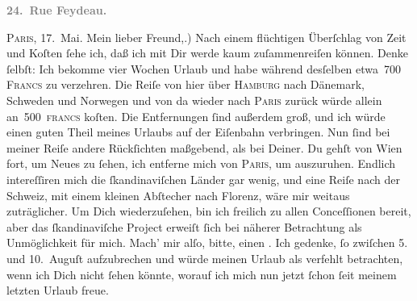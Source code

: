 \begin{ledgroupsized}[t]{13cm}
           \pstart
           \begin{otherlanguage}{french}\textcolor{gray}{\textbf{\textbf{24. Rue Feydeau.}}}\end{otherlanguage}\hfill \textsc{Paris}, 17. Mai.\pend
           \pstart\center{}Mein lieber Freund,\pend{}.) Nach einem flüchtigen Überſchlag von Zeit und Koſten ſehe ich, daß ich mit Dir
               werde kaum zuſammenreiſen können. Denke ſelbſt: Ich bekomme vier Wochen Urlaub und
               habe während desſelben etwa 700 \textsc{Francs} zu verzehren. Die
               Reiſe von hier über \textsc{Hamburg} nach Dänemark, Schweden und Norwegen und von da wieder nach \textsc{Paris} zurück würde allein an 500 \textsc{francs} koſten. Die
               Entfernungen {\pb}ſind außerdem groß, und ich würde
               einen guten Theil meines Urlaubs auf der Eiſenbahn verbringen. Nun ſind bei meiner
               Reiſe andere Rückſichten maßgebend, als bei Deiner. Du gehſt von Wien fort, um Neues zu ſehen, ich entferne mich von \textsc{Paris}, um auszuruhen. Endlich intereſſiren mich die ſkandinaviſchen Länder gar wenig, und eine Reiſe nach der Schweiz, mit einem kleinen Abſtecher nach Florenz, wäre mir weitaus zuträglicher. Um Dich wiederzuſehen,
               bin ich freilich zu allen Conceſſionen {\pb}bereit, aber
               das ſkandinaviſche Project erweiſt ſich bei näherer Betrachtung als
               Unmöglichkeit für mich. Mach’ mir alſo, bitte, einen \label{K_L02774-1v}\label{K_L02774-1h}. Ich gedenke, ſo zwiſchen 5. und 10. Auguſt aufzubrechen und würde meinen Urlaub als
               verfehlt betrachten, wenn ich Dich nicht ſehen könnte, worauf ich mich nun jetzt
               ſchon ſeit meinem letzten Urlaub freue.\pend

\end{ledgroupsized}

